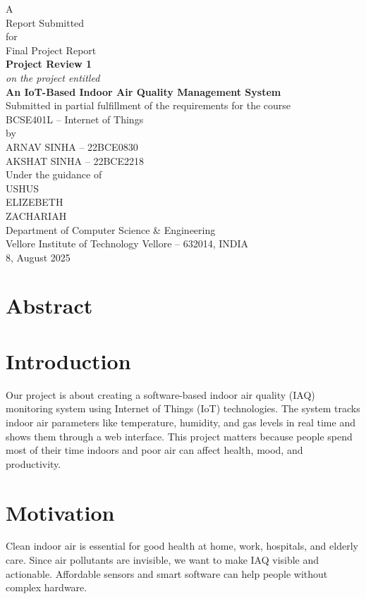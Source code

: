 \documentclass[12pt]{report}
\newcommand{\course}{BCSE401L -- Internet of Things}
\newcommand{\projecttitle}{An IoT-Based Indoor Air Quality Management System}
\newcommand{\institute}{Vellore Institute of Technology Vellore -- 632014, INDIA}
\newcommand{\dept}{Department of Computer Science \& Engineering}
\newcommand{\authors}{ARNAV SINHA -- 22BCE0830\\AKSHAT SINHA -- 22BCE2218}
\newcommand{\guides}{USHUS\\ELIZEBETH\\ZACHARIAH}
\newcommand{\reportdate}{8, August 2025}
\begin{document}
\begin{titlepage}
\centering
\vspace*{1cm}
{\large A\\[6pt] Report Submitted\\[6pt] for\\[6pt] Final Project Report}\\[12pt]
{\bfseries\Large Project Review 1}\\[10pt]
{\itshape on the project entitled}\\[4pt]
{\bfseries\LARGE \projecttitle}\\[8pt]
{\large Submitted in partial fulfillment of the requirements for the course}\\[4pt]
{\Large \course}\\[12pt]
{by}\\[6pt]
{\large \authors}\\[12pt]
{Under the guidance of}\\[6pt]
{\large \guides}\\[12pt]
\vfill
{}
{\dept}\\[4pt]
{\institute}\\[6pt]
{\reportdate}
\end{titlepage}

\tableofcontents
\cleardoublepage
{}

\section*{Abstract}

\section{Introduction}
Our project is about creating a software-based indoor air quality (IAQ) monitoring system using Internet of Things (IoT) technologies. The system tracks indoor air parameters like temperature, humidity, and gas levels in real time and shows them through a web interface. This project matters because people spend most of their time indoors and poor air can affect health, mood, and productivity.

\section{Motivation}
Clean indoor air is essential for good health at home, work, hospitals, and elderly care. Since air pollutants are invisible, we want to make IAQ visible and actionable. Affordable sensors and smart software can help people without complex hardware.
\end{document}
